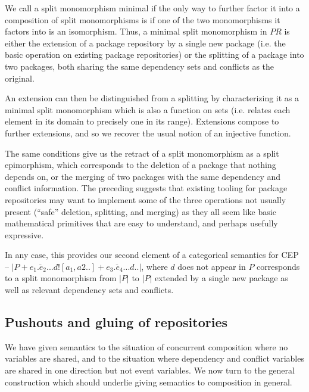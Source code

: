 \documentclass[hoptionsi,review,screen,format=sigconf]{acmart}
\theoremstyle{definition}
\newcommand{\PRb}{\mathit{PR}}
\begin{document}
We call a split monomorphism minimal if the only way to further factor it into a composition of split monomorphisms is if one of the two monomorphisms it factors into is an isomorphism. Thus, a minimal split monomorphism in \(\PRb\) is either the extension of a package repository by a single new package (i.e. the basic operation on existing package repositories) or the splitting of a package into two packages, both sharing the same dependency sets and conflicts as the original. 

An extension can then be distinguished from a splitting by characterizing it as a minimal split monomorphism which is also a function on sets (i.e. relates each element in its domain to precisely one in its range). Extensions compose to further extensions, and so we recover the usual notion of an injective function.


The same conditions give us the retract of a split monomorphism as a split epimorphism, which corresponds to the deletion of a package that nothing depends on, or the merging of two packages with the same dependency and conflict information. The preceding suggests that existing tooling for package repositories may want to implement some of the three operations not usually present (``safe'' deletion, splitting, and merging) as they all seem like basic mathematical primitives that are easy to understand, and perhaps usefully expressive.

In any case, this provides our second element of a categorical semantics for CEP -- \(|P + \overline{e_1.e_2..}.d![a_1,a2..] + \overline{e_3.e_4..}.d ..|\), where \(d\) does not appear in \(P\) corresponds to a split monomorphism from \(|P|\) to \(|P|\) extended by a single new package as well as relevant dependency sets and conflicts.


\subsection{Pushouts and gluing of repositories}

We have given semantics to the situation of concurrent composition where no variables are shared, and to the situation where dependency and conflict variables are shared in one direction but not event variables. We now turn to the general construction which should underlie giving semantics to composition in general. 
\end{document}
